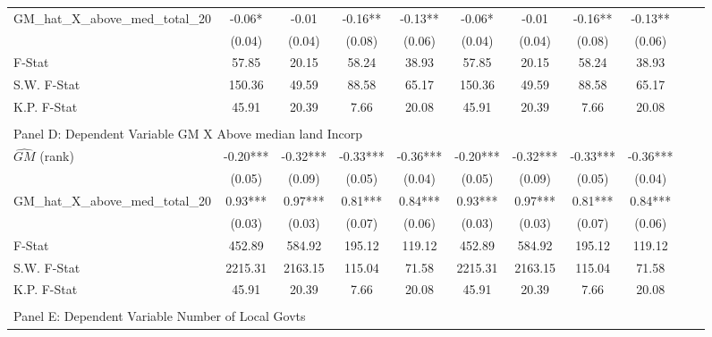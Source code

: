 \begin{table}[htbp]
\begin{threeparttable}
\begin{tabular}{l*{10}{c}}
\addlinespace
GM\_hat\_X\_above\_med\_total\_20&      -0.06*  &      -0.01   &      -0.16** &      -0.13** &      -0.06*  &      -0.01   &      -0.16** &      -0.13** \\
                &     (0.04)   &     (0.04)   &     (0.08)   &     (0.06)   &     (0.04)   &     (0.04)   &     (0.08)   &     (0.06)   \\
\midrule
F-Stat          &      57.85   &      20.15   &      58.24   &      38.93   &      57.85   &      20.15   &      58.24   &      38.93   \\
S.W. F-Stat     &     150.36   &      49.59   &      88.58   &      65.17   &     150.36   &      49.59   &      88.58   &      65.17   \\
K.P. F-Stat     &      45.91   &      20.39   &       7.66   &      20.08   &      45.91   &      20.39   &       7.66   &      20.08   \\
\cmidrule[\heavyrulewidth](lr){1-9} \\ \cmidrule[\heavyrulewidth](lr){1-9}
\multicolumn{8}{l}{Panel D: Dependent Variable GM X Above median land Incorp}\\
\cmidrule(lr){1-9}
$\hat{GM}$ (rank)&      -0.20***&      -0.32***&      -0.33***&      -0.36***&      -0.20***&      -0.32***&      -0.33***&      -0.36***\\
                &     (0.05)   &     (0.09)   &     (0.05)   &     (0.04)   &     (0.05)   &     (0.09)   &     (0.05)   &     (0.04)   \\
\addlinespace
GM\_hat\_X\_above\_med\_total\_20&       0.93***&       0.97***&       0.81***&       0.84***&       0.93***&       0.97***&       0.81***&       0.84***\\
                &     (0.03)   &     (0.03)   &     (0.07)   &     (0.06)   &     (0.03)   &     (0.03)   &     (0.07)   &     (0.06)   \\
\midrule
F-Stat          &     452.89   &     584.92   &     195.12   &     119.12   &     452.89   &     584.92   &     195.12   &     119.12   \\
S.W. F-Stat     &    2215.31   &    2163.15   &     115.04   &      71.58   &    2215.31   &    2163.15   &     115.04   &      71.58   \\
K.P. F-Stat     &      45.91   &      20.39   &       7.66   &      20.08   &      45.91   &      20.39   &       7.66   &      20.08   \\
\cmidrule[\heavyrulewidth](lr){1-9} \\ \cmidrule[\heavyrulewidth](lr){1-9}
\multicolumn{8}{l}{Panel E: Dependent Variable Number of Local Govts}\\

\end{tabular}
\end{threeparttable}
\end{table}
